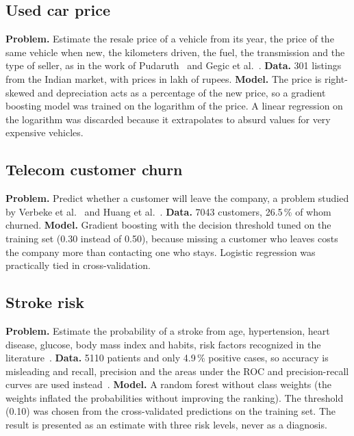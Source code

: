 \documentclass[11pt,letterpaper]{article}
\begin{document}
\subsection{Used car price}

\textbf{Problem.} Estimate the resale price of a vehicle from its year, the price of the same vehicle when new, the kilometers driven, the fuel, the transmission and the type of seller, as in the work of Pudaruth~\cite{pudaruth2014} and Gegic et al.~\cite{gegic2019}. \textbf{Data.} 301 listings from the Indian market, with prices in lakh of rupees. \textbf{Model.} The price is right-skewed and depreciation acts as a percentage of the new price, so a gradient boosting model was trained on the logarithm of the price. A linear regression on the logarithm was discarded because it extrapolates to absurd values for very expensive vehicles.

\subsection{Telecom customer churn}

\textbf{Problem.} Predict whether a customer will leave the company, a problem studied by Verbeke et al.~\cite{verbeke2012} and Huang et al.~\cite{huang2012}. \textbf{Data.} 7043 customers, 26.5\,\% of whom churned. \textbf{Model.} Gradient boosting with the decision threshold tuned on the training set (0.30 instead of 0.50), because missing a customer who leaves costs the company more than contacting one who stays. Logistic regression was practically tied in cross-validation.

\subsection{Stroke risk}

\textbf{Problem.} Estimate the probability of a stroke from age, hypertension, heart disease, glucose, body mass index and habits, risk factors recognized in the literature~\cite{wolf1991,odonnell2016}. \textbf{Data.} 5110 patients and only 4.9\,\% positive cases, so accuracy is misleading and recall, precision and the areas under the ROC and precision-recall curves are used instead~\cite{saito2015}. \textbf{Model.} A random forest without class weights (the weights inflated the probabilities without improving the ranking). The threshold (0.10) was chosen from the cross-validated predictions on the training set. The result is presented as an estimate with three risk levels, never as a diagnosis.
\end{document}
